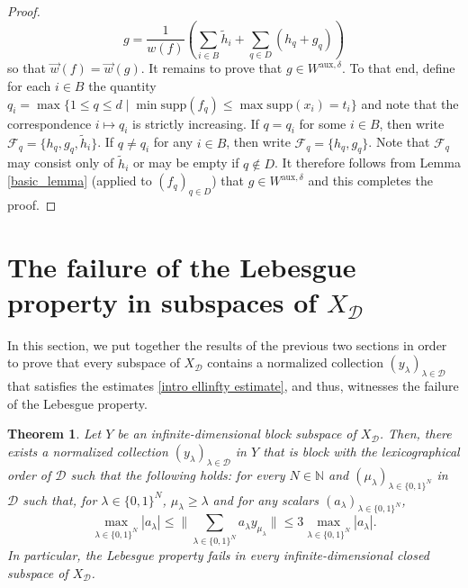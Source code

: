 \documentclass[12pt,a4paper]{amsart}
\newcommand{\N}{\mathbb{N}}
\newcommand{\bes}{\begin{equation*}}
\newcommand{\ees}{\end{equation*}}
\newcommand{\supp}{\text{supp}}
\theoremstyle{definition}
\theoremstyle{plain}
\newtheorem{theorem}[question]{Theorem}
\begin{document}
\begin{proof}
\bes g=\frac{1}{w(f)}\left(\sum_{i\in B}\tilde{h}_{i}+\sum_{q\in D}(h_{q}+g_{q})\right) \ees
so that $\vec w(f)=\vec w(g)$. It remains to prove that $g\in W^{\text{aux},\delta}$. To that end, define for each $i\in B$ the quantity $q_{i}=\max\{1\leq q\leq d \mid \min\supp(f_{q})\leq \max\supp(x_{i})=t_{i}\}$ and note that the correspondence $i\mapsto q_{i}$ is strictly increasing. If $q=q_{i}$ for some $i\in B$, then write $\mathcal{F}_{q}=\{h_{q},g_{q},\tilde{h}_{i}\}$. If $q\neq q_{i}$ for any $i\in B$, then write $\mathcal{F}_{q}=\{h_{q},g_{q}\}$. Note that $\mathcal{F}_{q}$ may consist only of $\tilde{h}_{i}$ or may be empty if $q\notin D$. It therefore follows from Lemma \ref{basic_lemma} (applied to $(f_{q})_{q\in D}$) that $g\in W^{\text{aux},\delta}$ and this completes the proof.
\end{proof}

\section{The failure of the Lebesgue property in subspaces of $X_\mathcal{D}$}{\label{sec6}}
In this section, we put together the results of the previous two sections in order to prove that every subspace of $X_{\mathcal{D}}$ contains a normalized collection $(y_\lambda)_{\lambda\in\mathcal{D}}$ that satisfies the estimates \eqref{intro ellinfty estimate}, and thus, witnesses the failure of the Lebesgue property.




\begin{theorem}{\label{main_result}}
Let $Y$ be an infinite-dimensional block subspace of $X_\mathcal{D}$. Then, there exists a normalized collection $(y_\lambda)_{\lambda\in\mathcal{D}}$ in $Y$ that is block with the lexicographical order of $\mathcal{D}$ such that the following holds: for every $N\in\N$ and $(\mu_\lambda)_{\lambda\in\{0,1\}^N}$ in $\mathcal{D}$ such that, for $\lambda\in\{0,1\}^N$, $\mu_\lambda\geq \lambda$ and for any scalars $(a_\lambda)_{\lambda\in\{0,1\}^N}$,
\[\max_{\lambda\in\{0,1\}^N}|a_\lambda|\leq \Big\|\sum_{\lambda\in\{0,1\}^N}a_\lambda y_{\mu_{\lambda}}\Big\| \leq 3\max_{\lambda\in\{0,1\}^N}|a_\lambda|.\]
In particular, the Lebesgue property fails in every infinite-dimensional closed subspace of $X_{\mathcal{D}}$.
\end{theorem}
\end{document}
